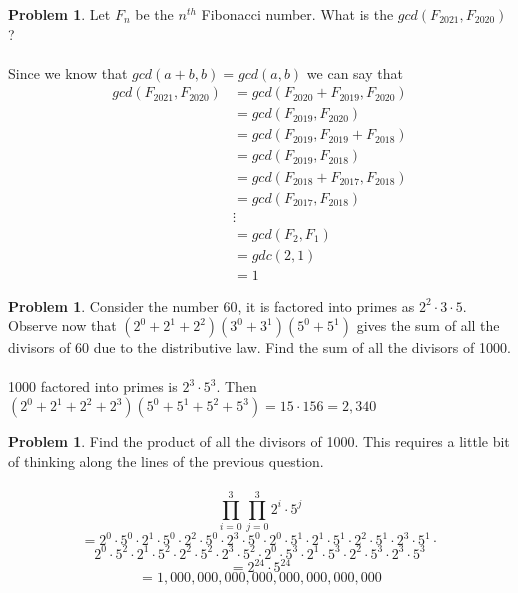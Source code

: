 \documentclass[10pt,leqno ]{article}
\theoremstyle{definition}
\newtheorem{problem}[theorem]{Problem}
\begin{document}
\begin{problem} Let $F_n$ be the $n^{th}$ Fibonacci number.  What is the $gcd(F_{2021}, F_{2020})$?
\\\\
\Large
Since we know that $gcd(a+b, b) = gcd(a,b)$ we can say that \\
\begin{align*}
gcd(F_{2021}, F_{2020}) &= gcd(F_{2020} + F_{2019}, F_{2020}) \\
                        &= gcd(F_{2019}, F_{2020}) \\
                        &= gcd(F_{2019}, F_{2019} + F_{2018}) \\
                        &= gcd(F_{2019}, F_{2018}) \\
                        &= gcd(F_{2018} + F_{2017}, F_{2018}) \\
                        &= gcd(F_{2017}, F_{2018}) \\
                        & \vdots\\
                        &= gcd(F_2, F_1)\\
                        &= gdc(2, 1)\\
                        &= 1
\end{align*}
\end{problem}
\newpage

\begin{problem} Consider the number 60, it is factored into primes as $2^2 \cdot 3 \cdot 5$.  Observe now that $(2^0+ 2^1+ 2^2)(3^0+ 3^1)(5^0+ 5^1)$ gives the sum of all the divisors of 60 due to the distributive law.  Find the sum of all the divisors of 1000.
\\\\
\Large
1000 factored into primes is $2^3 \cdot 5^3$.  Then $(2^0 + 2^1 + 2^2 + 2^3)( 5^0 + 5^1 + 5^2 + 5^3) = 15 \cdot 156 = 2,340$
\end{problem}
\newpage

\begin{problem} Find the product of all the divisors of 1000.  This requires a little bit of thinking along the lines of the previous question.
\\\\
\Large
$$\prod_{i=0}^{3} \prod_{j=0}^{3}2^i \cdot 5^j$$
$$= 2^0 \cdot 5^0 \cdot 2^1 \cdot 5^0 \cdot 2^2 \cdot 5^0 \cdot 2^3 \cdot 5^0 \cdot 2^0 \cdot 5^1 \cdot 2^1 \cdot 5^1 \cdot 2^2 \cdot 5^1 \cdot 2^3 \cdot 5^1 \cdot$$
$$2^0 \cdot 5^2 \cdot 2^1 \cdot 5^2 \cdot 2^2 \cdot 5^2 \cdot 2^3 \cdot 5^2 \cdot 2^0 \cdot 5^3 \cdot 2^1 \cdot 5^3 \cdot 2^2 \cdot 5^3 \cdot 2^3 \cdot 5^3$$
$$ = 2^{24} \cdot 5^{24}$$
$$ = 1,000,000,000,000,000,000,000,000$$
\end{problem}
\newpage
\end{document}
